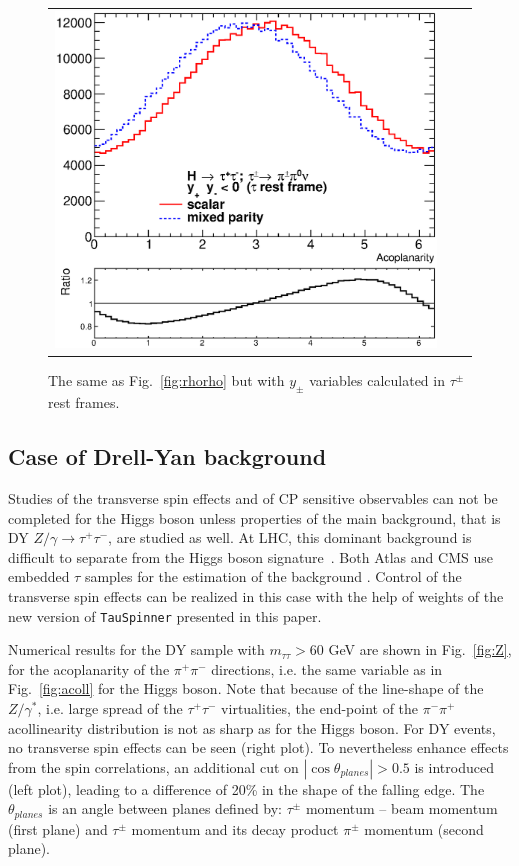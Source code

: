 \documentclass[12pt]{article}
\begin{document}
\begin{figure}[htp!]
\begin{tabular}{ccc}
  \includegraphics[width=0.48\columnwidth]{coplanarity-angle-D-tau.eps} 
\end{tabular}
\caption{
The same as Fig.~\ref{fig:rhorho} but with $y_\pm$ variables
calculated in  $\tau^\pm$ rest frames.
\label{fig:acopRF}}
\end{figure}




\subsection {Case of Drell-Yan background}
\label{sec:CaseDY}

Studies of the transverse spin effects and of CP sensitive observables can not 
be completed for the Higgs boson unless properties of the main background, 
that is DY $Z/\gamma \to \tau^+ \tau^-$, are studied as well.  At LHC, this dominant background 
is difficult to  separate from the Higgs boson signature~\cite{ATLASHtautau}.
Both Atlas and CMS use embedded $\tau$ samples for the estimation of the background
\cite{ATLASHtautau, CMSHTautau}.
Control of the transverse spin effects can be realized in this case with the help of
weights of the new version of {\tt TauSpinner} presented in this paper.

Numerical results for the DY  sample  with $m_{\tau \tau} > 60$ GeV  are shown in Fig.~\ref{fig:Z},
for the acoplanarity of the $\pi^+\pi^-$ directions, i.e.  the same variable as in Fig.~\ref{fig:acoll} for the Higgs boson. 
Note that because of the line-shape of the $Z/\gamma^*$, i.e. large spread of the $\tau^+\tau^-$ virtualities, the 
end-point of the $\pi^-\pi^+ $ acollinearity distribution is not as sharp 
as for the Higgs boson. For DY events, 
no transverse spin effects can be seen (right plot).  To nevertheless enhance effects from the spin correlations,
an additional cut on $|\cos \theta_{planes}|> 0.5$ is introduced (left plot), leading to a difference of  
20\% in the shape of the falling edge.
The $\theta_{planes}$ is an angle between planes defined by: $\tau^\pm$ momentum -- beam
momentum (first plane) and  $\tau^\pm$ momentum 
and its decay product $\pi^\pm$ momentum (second plane). 
\end{document}
